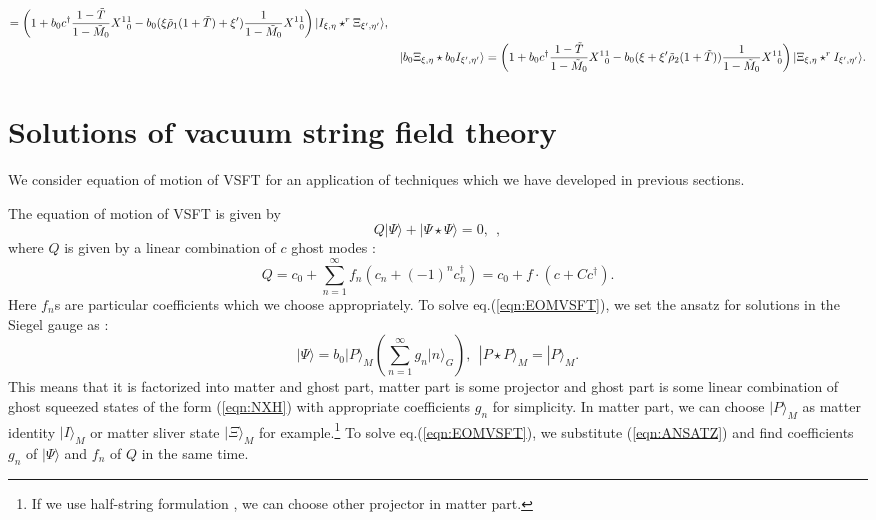 \documentclass[12pt,a4paper]{article}
\def\T{{\tilde T}}
\def\M0{{\tilde M}_0}
\begin{document}
\begin{eqnarray}
=\left(1+b_0c^\dagger{1-\T \over1-\M0 }X^1{}^1_0-b_0(\xi{\tilde \rho}_1(1+\T )+\xi'){1\over1-\M0 }X^1{}^1_0\right)|I_{\xi,\eta}\star^r \Xi_{\xi',\eta'}\rangle,\nonumber \\
&&|b_0\Xi_{\xi,\eta}\star b_0I_{\xi',\eta'}\rangle 
=\left(1+b_0c^\dagger{1-\T \over1-\M0 }X^1{}^1_0-b_0(\xi+\xi'{\tilde \rho}_2 (1+\T )){1\over1-\M0 }X^1{}^1_0\right)|\Xi_{\xi,\eta}\star^r I_{\xi',\eta'}\rangle.\nonumber \\
\end{eqnarray}


\section{Solutions of vacuum string field theory \label{sec:VSFT}}

We consider equation of motion of VSFT \cite{VSFT} for an application of techniques which we have developed in previous sections.

The equation of motion of VSFT is given by
\begin{equation}
\label{eqn:EOMVSFT}
Q|\Psi\rangle+|\Psi\star\Psi\rangle=0,\ \ ,
\end{equation}
where  $Q$ is given by a linear combination of $c$ ghost modes :
\begin{equation}
\label{eqn:VSFTQ}
Q=c_0+\sum_{n=1}^\infty f_n(c_n+(-1)^n c^\dagger_n)=c_0+f\cdot (c+Cc^\dagger).
\end{equation}
Here $f_n$s are particular coefficients which we choose appropriately.
To solve eq.(\ref{eqn:EOMVSFT}), we set the ansatz for solutions in the Siegel gauge as :
\begin{equation}
\label{eqn:ANSATZ}
|\Psi\rangle=b_0|P\rangle_M\left(\sum_{n=1}^\infty g_n |n \rangle_G\right),\ \ |P\star P\rangle_M=|P\rangle_M.
\end{equation}
This means that it is factorized into matter and ghost part, matter part is some projector and ghost part is some linear combination of ghost squeezed states of the form (\ref{eqn:NXH}) with appropriate coefficients $g_n$ for simplicity.
In matter part, we can choose $|P\rangle_M$ as matter identity $|I\rangle_M$ or matter sliver state $|\Xi\rangle_M$ for example.\footnote{
	If we use half-string formulation \cite{HALF}\cite{RSZ}\cite{KOM}, we can choose other projector in matter part.
} To solve eq.(\ref{eqn:EOMVSFT}), we substitute (\ref{eqn:ANSATZ}) and find coefficients $g_n$ of $|\Psi\rangle$ and  $f_n$ of $Q$ in the same time.
\end{document}

